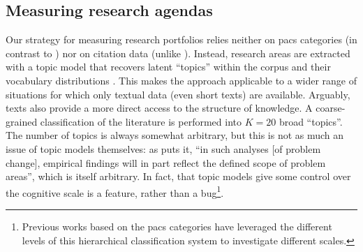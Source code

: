 \documentclass{article}
\begin{document}
\subsection{\label{sec:topics}Measuring research agendas}

Our strategy for measuring research portfolios relies neither on \gls{pacs} categories (in contrast to \citealt{Jia2017,Battiston2019,Aleta2019,Tripodi2020}) nor on citation data (unlike \citealt{Zeng2019}). Instead, research areas are extracted with a topic model that recovers latent ``topics'' within the corpus and their vocabulary distributions \citep{Blei2003,Griffiths2004}. This makes the approach applicable to a wider range of situations for which only textual data (even short texts) are available. Arguably, texts also provide a more direct access to the structure of knowledge. A coarse-grained classification of the literature is performed into $K=20$ broad ``topics''. The number of topics is always somewhat arbitrary, but this is not as much an issue of topic models themselves: as \citet{Gieryn1978} puts it, ``in such analyses [of problem change], empirical findings will in part reflect the defined scope of problem areas'', which is itself arbitrary. In fact, that topic models give some control over the cognitive scale is a feature, rather than a bug\footnote{Previous works based on the \gls{pacs} categories have leveraged the different levels of this hierarchical classification system to investigate different scales.}.
\end{document}

